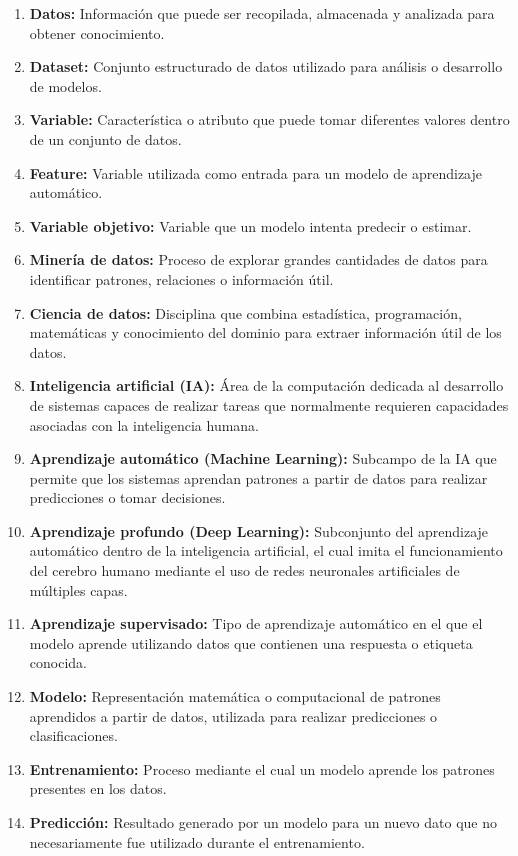 \documentclass[11pt,letterpaper,DIV=12]{scrartcl}
\begin{document}
\begin{enumerate}
  \item \textbf{Datos:} Información que puede ser recopilada, almacenada y analizada para obtener conocimiento.
  \item \textbf{Dataset:} Conjunto estructurado de datos utilizado para análisis o desarrollo de modelos.
  \item \textbf{Variable:} Característica o atributo que puede tomar diferentes valores dentro de un conjunto de datos.
  \item \textbf{Feature:} Variable utilizada como entrada para un modelo de aprendizaje automático.
  \item \textbf{Variable objetivo:} Variable que un modelo intenta predecir o estimar.
  \item \textbf{Minería de datos:} Proceso de explorar grandes cantidades de datos para identificar patrones, relaciones o información útil.
  \item \textbf{Ciencia de datos:} Disciplina que combina estadística, programación, matemáticas y conocimiento del dominio para extraer información útil de los datos.
  \item \textbf{Inteligencia artificial (IA):} Área de la computación dedicada al desarrollo de sistemas capaces de realizar tareas que normalmente requieren capacidades asociadas con la inteligencia humana.
  \item \textbf{Aprendizaje automático (Machine Learning):} Subcampo de la IA que permite que los sistemas aprendan patrones a partir de datos para realizar predicciones o tomar decisiones.
  \item \textbf{Aprendizaje profundo (Deep Learning):} Subconjunto del aprendizaje automático dentro de la inteligencia artificial, el cual imita el funcionamiento del cerebro humano mediante el uso de redes neuronales artificiales de múltiples capas.
  \item \textbf{Aprendizaje supervisado:} Tipo de aprendizaje automático en el que el modelo aprende utilizando datos que contienen una respuesta o etiqueta conocida.
  \item \textbf{Modelo:} Representación matemática o computacional de patrones aprendidos a partir de datos, utilizada para realizar predicciones o clasificaciones.
  \item \textbf{Entrenamiento:} Proceso mediante el cual un modelo aprende los patrones presentes en los datos.
  \item \textbf{Predicción:} Resultado generado por un modelo para un nuevo dato que no necesariamente fue utilizado durante el entrenamiento.

\end{enumerate}
\end{document}
